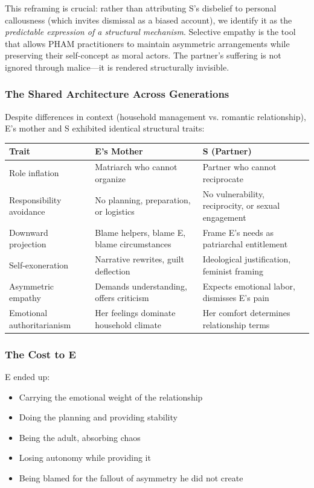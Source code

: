 \documentclass[12pt, letterpaper]{article}
\begin{document}
This reframing is crucial: rather than attributing S's disbelief to personal callousness (which invites dismissal as a biased account), we identify it as the \textit{predictable expression of a structural mechanism}. Selective empathy is the tool that allows PHAM practitioners to maintain asymmetric arrangements while preserving their self-concept as moral actors. The partner's suffering is not ignored through malice---it is rendered structurally invisible.

\subsubsection{The Shared Architecture Across Generations}

Despite differences in context (household management vs. romantic relationship), E's mother and S exhibited identical structural traits:

\begin{center}
\begin{tabular}{|p{2in}|p{2in}|p{2in}|}
\hline
\textbf{Trait} & \textbf{E's Mother} & \textbf{S (Partner)} \\
\hline
Role inflation & Matriarch who cannot organize & Partner who cannot reciprocate \\
\hline
Responsibility avoidance & No planning, preparation, or logistics & No vulnerability, reciprocity, or sexual engagement \\
\hline
Downward projection & Blame helpers, blame E, blame circumstances & Frame E's needs as patriarchal entitlement \\
\hline
Self-exoneration & Narrative rewrites, guilt deflection & Ideological justification, feminist framing \\
\hline
Asymmetric empathy & Demands understanding, offers criticism & Expects emotional labor, dismisses E's pain \\
\hline
Emotional authoritarianism & Her feelings dominate household climate & Her comfort determines relationship terms \\
\hline
\end{tabular}
\end{center}

\subsubsection{The Cost to E}

E ended up:
\begin{itemize}
    \item Carrying the emotional weight of the relationship
    \item Doing the planning and providing stability
    \item Being the adult, absorbing chaos
    \item Losing autonomy while providing it
    \item Being blamed for the fallout of asymmetry he did not create
\end{itemize}
\end{document}
